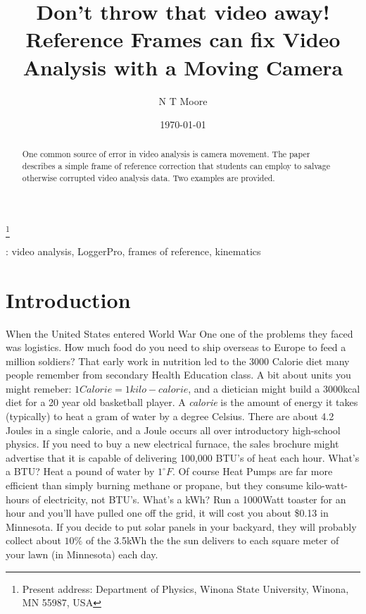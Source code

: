 \documentclass[12pt]{iopart}
\begin{document}
\title[Don't throw that video away! Reference Frames can fix Video Analysis with a Moving Camera]{Don't throw that video away! Reference Frames can fix Video Analysis with a Moving Camera}
\author{N T Moore}
\footnote{Present address:
Department of Physics, Winona State University, Winona, MN 55987, USA}
\date{\today}
\begin{abstract}
One common source of error in video analysis is camera movement.  The paper describes a simple frame of reference correction that students can employ to salvage otherwise corrupted video analysis data.  Two examples are provided. 
\end{abstract}
: video analysis, LoggerPro, frames of reference, kinematics
\submitto{\PED}
\maketitle

\section{Introduction}
When the United States entered World War One one of the problems they faced was logistics.  How much food do you need to ship overseas to Europe to feed a million soldiers?  That early work in nutrition led to the 3000 Calorie diet many people remember from secondary Health Education class.  A bit about units you might remeber: $1 Calorie = 1 kilo-calorie$, and a dietician might build a 3000kcal diet for a 20 year old basketball player.  A \textit{calorie} is the amount of energy it takes (typically) to heat a gram of water by a degree Celsius.  There are about 4.2 Joules in a single calorie, and a Joule occurs all over introductory high-school physics.  If you need to buy a new electrical furnace, the sales brochure might advertise that it is capable of delivering 100,000 BTU's of heat each hour.  What's a BTU? Heat a pound of water by $1^{\circ}F$.  Of course Heat Pumps are far more efficient than simply burning methane or propane, but they consume kilo-watt-hours of electricity, not BTU's.  What's a kWh?  Run a 1000Watt toaster for an hour and you'll have pulled one off the grid, it will cost you about \$0.13 in Minnesota.  If you decide to put solar panels in your backyard, they will probably collect about $10\%$ of the 3.5kWh the  the sun delivers to each square meter of your lawn (in Minnesota) each day.  
\end{document}
